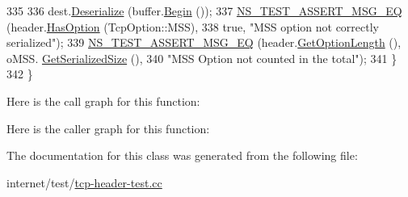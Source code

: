 \begin{DoxyCode}
335 
336     dest.\hyperlink{classns3_1_1TcpHeader_ac9ebbec6f00c4d7d040c1d68dbe8c793}{Deserialize} (buffer.\hyperlink{classns3_1_1Buffer_a893d4bf50df13e730b6cd0fda91b967f}{Begin} ());
337     \hyperlink{group__testing_ga2a9d78cffb3db8e867c35fff0b698cf5}{NS\_TEST\_ASSERT\_MSG\_EQ} (header.\hyperlink{classns3_1_1TcpHeader_aacc07bdab91925f1cddf9bcb1ae91d13}{HasOption} (TcpOption::MSS),
338                            \textcolor{keyword}{true}, \textcolor{stringliteral}{"MSS option not correctly serialized"});
339     \hyperlink{group__testing_ga2a9d78cffb3db8e867c35fff0b698cf5}{NS\_TEST\_ASSERT\_MSG\_EQ} (header.\hyperlink{classns3_1_1TcpHeader_a60a2f9b6bf273dd10646afba6c205fec}{GetOptionLength} (), oMSS.
      \hyperlink{classns3_1_1TcpOptionMSS_a35cdbf284ed4eb34160543273034da5c}{GetSerializedSize} (),
340                            \textcolor{stringliteral}{"MSS Option not counted in the total"});
341   \}
342 \}
\end{DoxyCode}


Here is the call graph for this function\+:




Here is the caller graph for this function\+:




The documentation for this class was generated from the following file\+:\begin{DoxyCompactItemize}
\item 
internet/test/\hyperlink{tcp-header-test_8cc}{tcp-\/header-\/test.\+cc}\end{DoxyCompactItemize}
